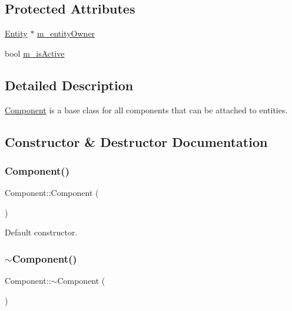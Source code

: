 \subsection*{Protected Attributes}
\begin{DoxyCompactItemize}
\item 
\mbox{\hyperlink{class_entity}{Entity}} $\ast$ \mbox{\hyperlink{class_component_a98e6a9c221fbd50fe38567a48d0da17e}{m\+\_\+entity\+Owner}}
\item 
bool \mbox{\hyperlink{class_component_a6ed72c25c8ea738ebc5a69c66728bf60}{m\+\_\+is\+Active}}
\end{DoxyCompactItemize}


\subsection{Detailed Description}
\mbox{\hyperlink{class_component}{Component}} is a base class for all components that can be attached to entities. 

\subsection{Constructor \& Destructor Documentation}
\mbox{\label{class_component_a8775db6d1a2c1afc2e77cd3c8f39da6f}} 
\subsubsection{\texorpdfstring{Component()}{Component()}}
{\footnotesize\ttfamily Component\+::\+Component (\begin{DoxyParamCaption}{ }\end{DoxyParamCaption})}

Default constructor. \mbox{\label{class_component_ab8378fa275af98e568a7e91d33d867af}} 
\subsubsection{\texorpdfstring{$\sim$\+Component()}{~Component()}}
{\footnotesize\ttfamily Component\+::$\sim$\+Component (\begin{DoxyParamCaption}{ }\end{DoxyParamCaption})\hspace{0.3cm}{\ttfamily [virtual]}}


